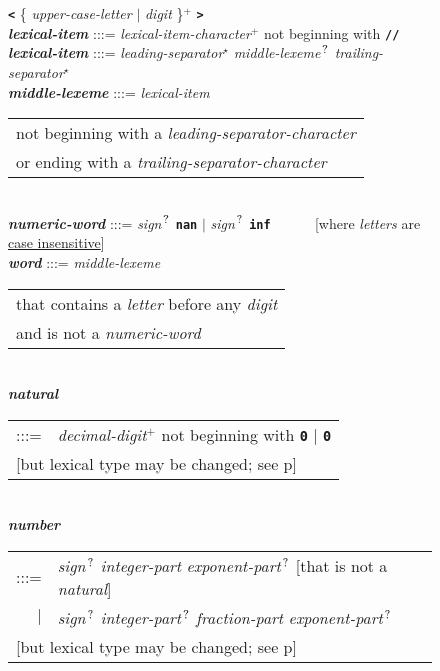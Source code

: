 \documentclass[12pt]{article}
\newcommand{\TT}[1]{{\tt \bfseries #1}}
\newcommand{\STAR}{{\Large $^\star$}}
\newcommand{\PLUS}[1][]{{$^{+#1}$}}
\newcommand{\QMARK}{{$^{\,\mbox{\footnotesize ?}}$}}
\newcommand{\ttkey}[1]{{\tt \bfseries #1}}
\newcommand{\emkey}[1]{{\em \bfseries #1}}
\newcommand{\pagref}[1]{p\pageref{#1}}
\newlength{\figurewidth}
\newenvironment{boxedfigure}[1][!btp]%
	{\begin{figure*}[#1]
	 \begin{lrbox}{\figurebox}
	 \begin{minipage}{\figurewidth}

	 \vspace*{1ex}}%
	{
	 \vspace*{1ex}

	 \end{minipage}
	 \end{lrbox}

	 \centering
	 \fbox{\hspace*{0.1in}\usebox{\figurebox}\hspace*{0.1in}}
	 \end{figure*}}
\begin{document}
\begin{boxedfigure}[!p]
    \TT{<} \{ {\em upper-case-letter} $|$ {\em digit} \}\PLUS{} \TT{>}
\\[1ex]
\emkey{lexical-item} :::= {\em lexical-item-character}\PLUS{}
                       not beginning with \TT{//}
\\[0.5ex]
\emkey{lexical-item} :::= {\em leading-separator}\STAR{}
			  {\em middle-lexeme}\QMARK{}
                          {\em trailing-separator}\STAR{}
\\[0.5ex]
\emkey{middle-lexeme} :::= 
	{\em lexical-item}
	\begin{tabular}[t]{@{}l@{}}
	not beginning with a {\em leading-separator-character} \\
	or ending with a {\em trailing-separator-character} \\
	\end{tabular}
\\[0.5ex]
\emkey{numeric-word} :::= {\em sign}\QMARK{} \ttkey{nan}
                      $|$ {\em sign}\QMARK{} \ttkey{inf}
		      ~~~~~
		      [where {\em letters} are \underline{case insensitive}]
\\[0.5ex]
\emkey{word} :::= {\em middle-lexeme}
                  \begin{tabular}[t]{@{}l@{}}
		  that contains a {\em letter} before any {\em digit} \\
		  and is not a {\em numeric-word}
		  \end{tabular}
\\[0.5ex]
\emkey{natural}\label{NATURAL}
	\begin{tabular}[t]{@{}rl@{}}
	:::= & {\em decimal-digit}\PLUS{} not beginning with \TT{0} $|$
	       \TT{0} \\
	\multicolumn{2}{l}{[but lexical type may be changed;
	                    see \pagref{LEXEME-TYPE-CONVERSION}]} \\
	\end{tabular}
\\[0.5ex]
\emkey{number}\label{NUMBER}
	\begin{tabular}[t]{@{}rl@{}}
	:::= & {\em sign}\QMARK{} {\em integer-part}
	                          {\em exponent-part}\QMARK{}
	     [that is not a {\em natural}] \\
	 $|$ & {\em sign}\QMARK{} {\em integer-part}\QMARK{}
	                          {\em fraction-part}
				  {\em exponent-part}\QMARK{} \\
	\multicolumn{2}{l}{[but lexical type may be changed;
	                    see \pagref{LEXEME-TYPE-CONVERSION}]} \\

\end{tabular}
\end{boxedfigure}
\end{document}
